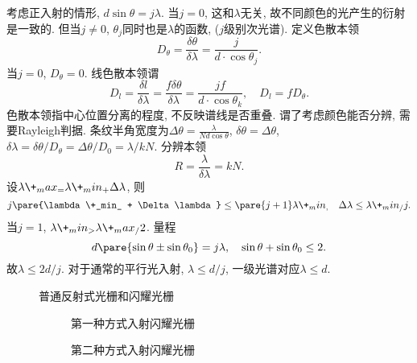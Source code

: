 \documentclass{ctexart}
\begin{document}
考虑正入射的情形, $d\sin\theta = j\lambda$. 当$j=0$, 这和$\lambda$无关, 故不同颜色的光产生的衍射是一致的. 但当$j\neq 0$, $\theta_j$同时也是$\lambda$的函数, ($j$级别次光谱). 定义色散本领
\[ D_\theta = \frac{\delta \theta}{\delta\lambda} = \frac{j}{d\cdot{\cos\theta_j}}. \]
当$j=0$, $D_\theta = 0$. 线色散本领谓
\[ D_l = \frac{\delta l}{\delta \lambda} = \frac{f\delta\theta}{\delta \lambda} = \frac{jf}{d\cdot{\cos\theta_k}},\quad D_l = fD_\theta. \]
色散本领指中心位置分离的程度, 不反映谱线是否重叠. 谓了考虑颜色能否分辨, 需要Rayleigh判据. 条纹半角宽度为$\Delta\theta = \displaystyle \frac{\lambda}{Nd\cos\theta}$, $\delta \theta = \Delta \theta$, $\delta \lambda = \delta\theta / D_\theta = \Delta \theta / D_0 = \lambda / kN$. 分辨本领
\[ R = \frac{\lambda}{\delta \lambda} = kN. \]
设$\lambda\+_max_ = \lambda\+_min_ + \Delta\lambda$, 则
\[ j\pare{\lambda\+_min_ + \Delta \lambda} \le \pare{j+1} \lambda\+_min_,\quad \Delta \lambda \le \lambda\+_min_ / j. \]
当$j=1$, $\lambda\+_min_ > \lambda\+_max_ /2$. 量程
\[ d\pare{\sin\theta \pm \sin\theta_0} = j\lambda,\quad \sin\theta + \sin\theta_0 \le 2. \]
故$\lambda \le 2d/j$. 对于通常的平行光入射, $\lambda \le d/j$, 一级光谱对应$\lambda \le d$.
\begin{figure}[ht]
    \centering
    \begin{subfigure}{5cm}
        \centering
        \caption{}
        \label{fig:闪耀光栅光程差}
    \end{subfigure}
    \begin{subfigure}{5cm}
        \centering
        \caption{}
        \label{fig:普通光栅光程差}
    \end{subfigure}
    \begin{subfigure}[b]{5cm}
        \centering
        \caption{}
        \label{fig:普通反射光栅单元}
    \end{subfigure}
    \begin{subfigure}[b]{5cm}
        \centering
        \caption{}
        \label{fig:闪耀光栅单元}
    \end{subfigure}
    \caption{普通反射式光栅和闪耀光栅}
\end{figure}
\begin{figure}[ht]
    \centering
    \begin{subfigure}{5cm}
        \centering
        \caption{第一种方式入射闪耀光栅}
        \label{fig:第一种方式入射闪耀光栅}
    \end{subfigure}
    \begin{subfigure}{5cm}
        \centering
        \caption{第二种方式入射闪耀光栅}
        \label{fig:第二种方式入射闪耀光栅}
    \end{subfigure}
    \caption{}
\end{figure}
\end{document}
